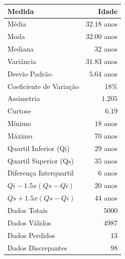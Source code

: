 \documentclass[10pt,a4paper,oneside]{article}
\begin{document}
\begin{figure}[h]
\centering
\begin{minipage}{0.52\textwidth}
\centering
\small
{}
\vspace{0.5em}
\label{table: medidas sintese idade}
\begin{tabular}{l r}
	\toprule
	\textbf{Medida}               & \textbf{Idade} \\
	\midrule
	Média                         & $32.18$ anos   \\
	Moda                          & $32.00$ anos   \\
	Mediana                       & $32$ anos      \\
	Variância                     & $31.83$ anos   \\
	Desvio Padrão                 & $5.64$ anos    \\
	Coeficiente de Variação       & $18 \%$        \\
	Assimetria                    & $1.205$        \\
	Curtose                       & $6.19$         \\
	Mínimo                        & $18$ anos      \\
	Máximo                        & $70$ anos      \\
	Quartil Inferior (Qi)         & $29$ anos      \\
	Quartil Superior (Qs)         & $35$ anos      \\
	Diferença Interquartil        & $6$  anos      \\
	$Qi-1.5x(Qs-Qi)$              & $20$ anos      \\
	$Qs+1.5x(Qs-Qi)$              & $44$ anos      \\
	Dados Totais                  & $5000$         \\
	Dados Válidos                 & $4987$         \\
	Dados Perdidos                & $13$           \\
	Dados Discrepantes            & $98$           \\
	\bottomrule
\end{tabular}
\end{minipage}
%
\begin{minipage}{0.46\textwidth}
	\centering

\end{minipage}
\end{figure}
\end{document}
